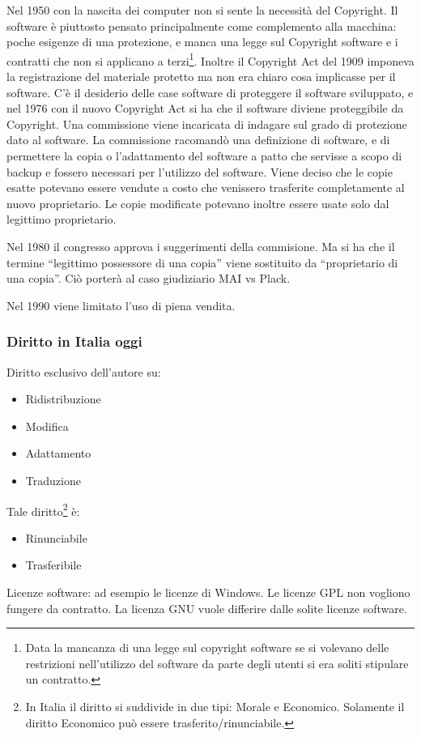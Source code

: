 Nel 1950 con la nascita dei computer non si sente la necessit\`a del Copyright. Il software \`e piuttosto pensato principalmente come complemento alla macchina: poche esigenze di una protezione, e manca una legge sul Copyright software e i contratti che non si applicano a terzi\footnote{Data la mancanza di una legge sul copyright software se si volevano delle restrizioni nell'utilizzo del software da parte degli utenti si era soliti stipulare un contratto.}. Inoltre il Copyright Act del 1909 imponeva la registrazione del materiale protetto ma non era chiaro cosa implicasse per il software.
C'\`e il desiderio delle case software di proteggere il software sviluppato, e nel 1976 con il nuovo Copyright Act si ha che il software diviene proteggibile da Copyright. Una commissione viene incaricata di indagare sul grado di protezione dato al software. La commissione racomand\`o una definizione di software, e di permettere la copia o l'adattamento del software a patto che servisse a scopo di backup e fossero necessari per l'utilizzo del software. Viene deciso che le copie esatte potevano essere vendute a costo che venissero trasferite completamente al nuovo proprietario. Le copie modificate potevano inoltre essere usate solo dal legittimo proprietario.

Nel 1980 il congresso approva i suggerimenti della commisione. Ma si ha che il termine ``legittimo possessore di una copia'' viene sostituito da ``proprietario di una copia''. Ci\`o porter\`a al caso giudiziario MAI vs Plack.

Nel 1990 viene limitato l'uso di piena vendita.

\subsubsection{Diritto in Italia oggi}

Diritto esclusivo dell'autore su:
\begin{itemize}

\item Ridistribuzione
\item Modifica
\item Adattamento
\item Traduzione

\end{itemize}

Tale diritto\footnote{In Italia il diritto si suddivide in due tipi: Morale e Economico. Solamente il diritto Economico pu\`o essere trasferito/rinunciabile.} \`e:
\begin{itemize}

\item Rinunciabile
\item Trasferibile

\end{itemize}

Licenze software: ad esempio le licenze di Windows. Le licenze GPL non vogliono fungere da contratto. La licenza GNU vuole differire dalle solite licenze software.
